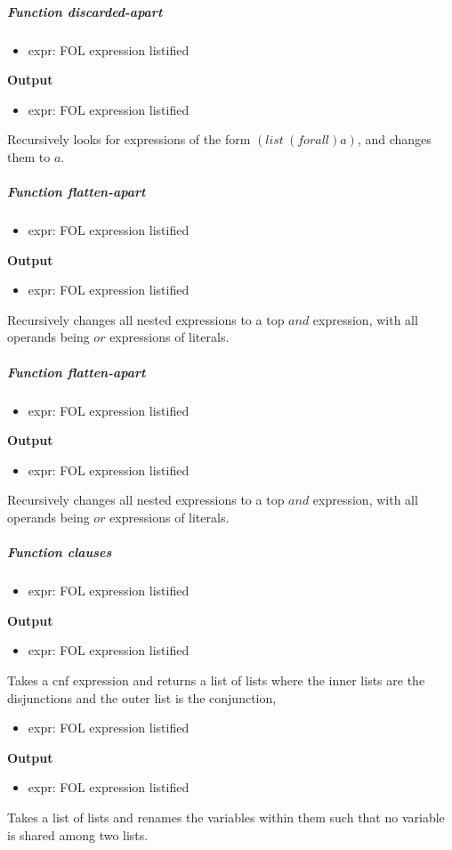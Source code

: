 \documentclass[paper=a4, fontsize=11pt]{scrartcl}
\numberwithin{equation}{section}		%
\numberwithin{figure}{section}			%
\numberwithin{table}{section}				%
\begin{document}
\subparagraph{Function discarded-apart}
\begin{itemize}
  \item {expr:} FOL expression listified
\end{itemize}
\noindent\textbf{Output}
\begin{itemize}
    \item{expr:} FOL expression listified
\end{itemize}
Recursively looks for expressions of the form $(list\ (forall) a)$, and changes
them to $a$.

\subparagraph{Function flatten-apart}
\begin{itemize}
  \item {expr:} FOL expression listified
\end{itemize}
\noindent\textbf{Output}
\begin{itemize}
    \item{expr:} FOL expression listified
\end{itemize}
Recursively changes all nested expressions to a top $and$ expression, with all
operands being $or$ expressions of literals.

\subparagraph{Function flatten-apart}
\begin{itemize}
  \item {expr:} FOL expression listified
\end{itemize}
\noindent\textbf{Output}
\begin{itemize}
    \item{expr:} FOL expression listified
\end{itemize}
Recursively changes all nested expressions to a top $and$ expression, with all
operands being $or$ expressions of literals.


\subparagraph{Function clauses}
\begin{itemize}
  \item {expr:} FOL expression listified
\end{itemize}
\noindent\textbf{Output}
\begin{itemize}
    \item{expr:} FOL expression listified
\end{itemize}
Takes a cnf expression and returns a list of lists where the inner lists are the
disjunctions and the outer list is the conjunction,

\begin{itemize}
  \item {expr:} FOL expression listified
\end{itemize}
\noindent\textbf{Output}
\begin{itemize}
    \item{expr:} FOL expression listified
\end{itemize}
Takes a list of lists and renames the variables within them such that no
variable is shared among two lists.
\end{document}
